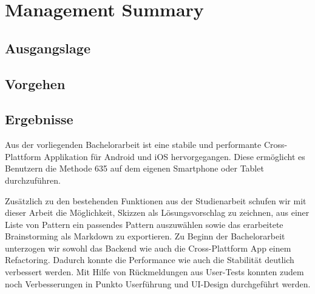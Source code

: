 \section{Management Summary}

\subsection{Ausgangslage}

\subsection{Vorgehen}

\subsection{Ergebnisse}
Aus der vorliegenden Bachelorarbeit ist eine stabile und performante Cross-Plattform Applikation für Android und iOS hervorgegangen. Diese ermöglicht es Benutzern die Methode 635 auf dem eigenen Smartphone oder Tablet durchzuführen.

Zusätzlich zu den bestehenden Funktionen aus der Studienarbeit schufen wir mit dieser Arbeit die Möglichkeit, Skizzen als Lösungsvorschlag zu zeichnen, aus einer Liste von Pattern ein passendes Pattern auszuwählen sowie das erarbeitete Brainstorming als Markdown zu exportieren. Zu Beginn der Bachelorarbeit unterzogen wir sowohl das Backend wie auch die Cross-Plattform App einem Refactoring. Dadurch konnte die Performance wie auch die Stabilität deutlich verbessert werden. Mit Hilfe von Rückmeldungen aus User-Tests konnten zudem noch Verbesserungen in Punkto Userführung und UI-Design durchgeführt werden.